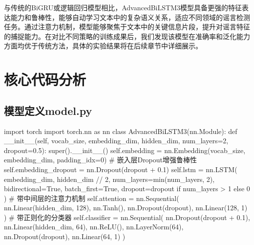 
\vspace{1em}
与传统的BiGRU或逻辑回归模型相比，AdvancedBiLSTM3模型具备更强的特征表达能力和鲁棒性，能够自动学习文本中的复杂语义关系，适应不同领域的谣言检测任务。通过注意力机制，模型能够聚焦于文本中的关键信息片段，提升对谣言特征的捕捉能力。在对比不同策略的训练成果后，我们发现该模型在准确率和泛化能力方面均优于传统方法，具体的实验结果将在后续章节中详细展示。

\newpage
\section{核心代码分析}

\subsection{模型定义model.py}
\begin{codeblock}[language=Python]
import torch
import torch.nn as nn
class AdvancedBiLSTM3(nn.Module):  
    def __init__(self, vocab_size, embedding_dim, hidden_dim, num_layers=2, dropout=0.5):  
        super().__init__()  
        self.embedding = nn.Embedding(vocab_size, embedding_dim, padding_idx=0)  
        # 嵌入层Dropout增强鲁棒性  
        self.embedding_dropout = nn.Dropout(dropout + 0.1) 
        self.lstm = nn.LSTM(  
            embedding_dim,  
            hidden_dim // 2,
            num_layers=min(num_layers, 2),  
            bidirectional=True,  
            batch_first=True,  
            dropout=dropout if num_layers > 1 else 0  
        )  
        # 带中间层的注意力机制  
        self.attention = nn.Sequential(  
            nn.Linear(hidden_dim, 128),  
            nn.Tanh(),  
            nn.Dropout(dropout),  
            nn.Linear(128, 1)  
        )  
        # 带正则化的分类器  
        self.classifier = nn.Sequential(  
            nn.Dropout(dropout + 0.1),  
            nn.Linear(hidden_dim, 64),  
            nn.ReLU(),  
            nn.LayerNorm(64),  
            nn.Dropout(dropout),  
            nn.Linear(64, 1)  
        )  
\end{codeblock}

